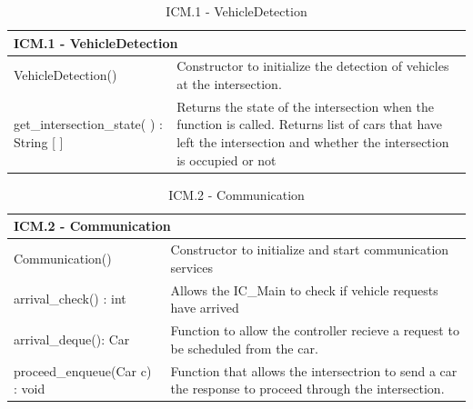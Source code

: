 \documentclass [10pt]{article}
\begin{document}
\begin{longtable}{| p{ } | p{ } | }\caption{ICM.1 - VehicleDetection} \\\hline  
 \multicolumn{2}{|l|}{\textbf {ICM.1 - VehicleDetection}}\\ \hline
 
\cellcolor{tableCell}VehicleDetection()& \cellcolor{tableCell}Constructor to initialize the detection of vehicles at the intersection. \\ \hline 

get\_intersection\_state( ) : String [ ] & Returns the state of the intersection when the function is called. Returns list of cars that have left the intersection and whether the intersection is occupied or not \\ \hline 



\end{longtable}

\begin{longtable}{| p{ } | p{ } | }\caption{ICM.2 - Communication} \\\hline  
 \multicolumn{2}{|l|}{\textbf {ICM.2 - Communication}}\\ \hline
 
\rowcolor{tableCell} Communication()& Constructor to initialize and start communication services \\\hline

arrival\_check() : int & Allows the IC\_Main to check if vehicle requests have arrived\\\hline


\rowcolor{tableCell} arrival\_deque(): Car & Function to allow the controller recieve a request to be scheduled from the car.\\ \hline 


 proceed\_enqueue(Car c) : void & Function that allows the intersectrion to send a car the response to proceed through the intersection. \\ \hline




\end{longtable}
\end{document}
